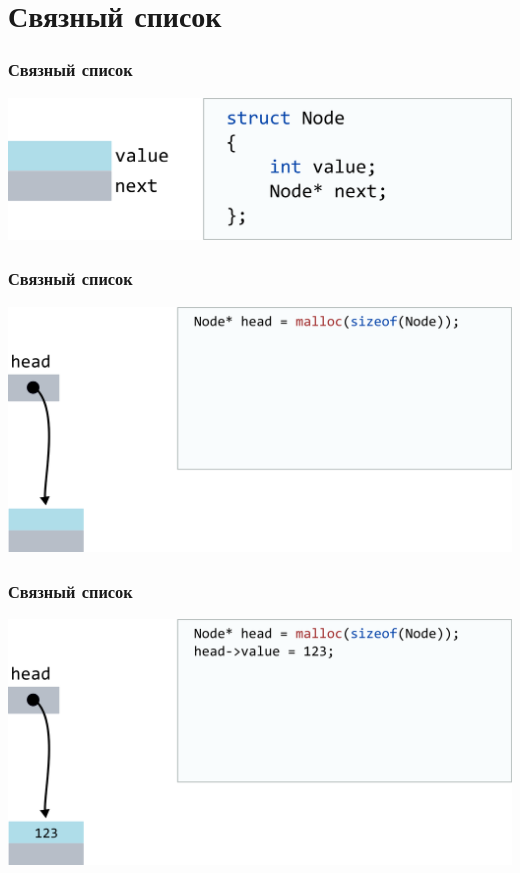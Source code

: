 \documentclass[10pt,pdf,hyperref={unicode}]{beamer}
\begin{document}
\section{Связный список}

\begin{frame}[fragile]
\frametitle{Связный список}
\begin{center}
\includegraphics[scale=0.6]{images/list/structlist.png}
\end{center}
\end{frame}

\begin{frame}[fragile]
\frametitle{Связный список}
\begin{center}
\includegraphics[scale=0.6]{images/list/codelist2.png}
\end{center}
\end{frame}


\begin{frame}[fragile]
\frametitle{Связный список}
\begin{center}
\includegraphics[scale=0.6]{images/list/codelist3.png}
\end{center}
\end{frame}
\end{document}
